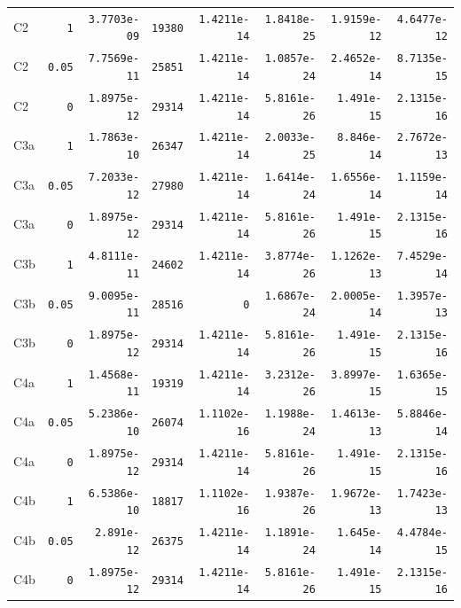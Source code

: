 \begin{longtable}{lrrrrrrr}
C2 & \texttt{1} & \texttt{3.7703e-09} & \texttt{19380} & \texttt{1.4211e-14} & \texttt{1.8418e-25} & \texttt{1.9159e-12} & \texttt{4.6477e-12} \\
C2 & \texttt{0.05} & \texttt{7.7569e-11} & \texttt{25851} & \texttt{1.4211e-14} & \texttt{1.0857e-24} & \texttt{2.4652e-14} & \texttt{8.7135e-15} \\
C2 & \texttt{0} & \texttt{1.8975e-12} & \texttt{29314} & \texttt{1.4211e-14} & \texttt{5.8161e-26} & \texttt{1.491e-15} & \texttt{2.1315e-16} \\
C3a & \texttt{1} & \texttt{1.7863e-10} & \texttt{26347} & \texttt{1.4211e-14} & \texttt{2.0033e-25} & \texttt{8.846e-14} & \texttt{2.7672e-13} \\
C3a & \texttt{0.05} & \texttt{7.2033e-12} & \texttt{27980} & \texttt{1.4211e-14} & \texttt{1.6414e-24} & \texttt{1.6556e-14} & \texttt{1.1159e-14} \\
C3a & \texttt{0} & \texttt{1.8975e-12} & \texttt{29314} & \texttt{1.4211e-14} & \texttt{5.8161e-26} & \texttt{1.491e-15} & \texttt{2.1315e-16} \\
C3b & \texttt{1} & \texttt{4.8111e-11} & \texttt{24602} & \texttt{1.4211e-14} & \texttt{3.8774e-26} & \texttt{1.1262e-13} & \texttt{7.4529e-14} \\
C3b & \texttt{0.05} & \texttt{9.0095e-11} & \texttt{28516} & \texttt{0} & \texttt{1.6867e-24} & \texttt{2.0005e-14} & \texttt{1.3957e-13} \\
C3b & \texttt{0} & \texttt{1.8975e-12} & \texttt{29314} & \texttt{1.4211e-14} & \texttt{5.8161e-26} & \texttt{1.491e-15} & \texttt{2.1315e-16} \\
C4a & \texttt{1} & \texttt{1.4568e-11} & \texttt{19319} & \texttt{1.4211e-14} & \texttt{3.2312e-26} & \texttt{3.8997e-15} & \texttt{1.6365e-15} \\
C4a & \texttt{0.05} & \texttt{5.2386e-10} & \texttt{26074} & \texttt{1.1102e-16} & \texttt{1.1988e-24} & \texttt{1.4613e-13} & \texttt{5.8846e-14} \\
C4a & \texttt{0} & \texttt{1.8975e-12} & \texttt{29314} & \texttt{1.4211e-14} & \texttt{5.8161e-26} & \texttt{1.491e-15} & \texttt{2.1315e-16} \\
C4b & \texttt{1} & \texttt{6.5386e-10} & \texttt{18817} & \texttt{1.1102e-16} & \texttt{1.9387e-26} & \texttt{1.9672e-13} & \texttt{1.7423e-13} \\
C4b & \texttt{0.05} & \texttt{2.891e-12} & \texttt{26375} & \texttt{1.4211e-14} & \texttt{1.1891e-24} & \texttt{1.645e-14} & \texttt{4.4784e-15} \\
C4b & \texttt{0} & \texttt{1.8975e-12} & \texttt{29314} & \texttt{1.4211e-14} & \texttt{5.8161e-26} & \texttt{1.491e-15} & \texttt{2.1315e-16} \\
\end{longtable}
\endgroup


